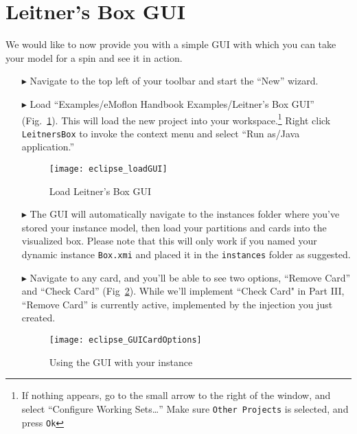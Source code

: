 \newpage
\section{Leitner's Box GUI}
\genHeader

We would like to now provide you with a simple GUI with which you can take your model for a spin and see it in action.

\begin{itemize}

\item[$\blacktriangleright$] Navigate to the top left of your toolbar and start the ``New'' wizard.

\item[$\blacktriangleright$] Load ``Examples/eMoflon Handbook Examples/Leitner's Box GUI'' (Fig.~\ref{fig:GUI_load}). This will load the new project into
your workspace.\footnote{If nothing appears, go to the small arrow to the right of the window, and select ``Configure Working Sets\ldots'' Make sure
\texttt{Other Projects} is selected, and press \texttt{Ok}} Right click \texttt{LeitnersBox} to invoke the context menu and select ``Run as/Java application.''

\begin{figure}[htbp]
    \centering
    \texttt{[image: eclipse\_loadGUI]}
    \caption{Load Leitner's Box GUI}
    \label{fig:GUI_load}
\end{figure}

\clearpage

\item[$\blacktriangleright$] The GUI will automatically navigate to the instances folder where you've stored your instance model, then load your partitions and
cards into the visualized box. Please note that this will only work if you named your dynamic instance \texttt{Box.xmi} and placed it in the \texttt{instances}
folder as suggested.

\vspace{0.5cm}

\item[$\blacktriangleright$] Navigate to any card, and you'll be able to see two options, ``Remove Card'' and ``Check Card'' (Fig~\ref{fig:GUI_cardOptions}).
While we'll implement ``Check Card" in Part III, ``Remove Card'' is currently active, implemented by the injection you just created.

\vspace{1cm}

\begin{figure}[htbp]
    \centering
    \texttt{[image: eclipse\_GUICardOptions]}
    \caption{Using the GUI with your instance}
    \label{fig:GUI_cardOptions}
\end{figure}


\end{itemize}
